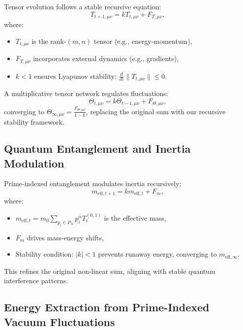 \documentclass{article}
\theoremstyle{plain}
\begin{document}
Tensor evolution follows a stable recursive equation:
\begin{equation}
    T_{t+1,\mu\nu} = k T_{t,\mu\nu} + F_{T,\mu\nu},
\end{equation}
where:
\begin{itemize}
    \item \( T_{t,\mu\nu} \) is the rank-$(m,n)$ tensor (e.g., energy-momentum),
    \item \( F_{T,\mu\nu} \) incorporates external dynamics (e.g., gradients),
    \item \( k < 1 \) ensures Lyapunov stability: \( \frac{d}{dt} \| T_{t,\mu\nu} \| \leq 0 \).
\end{itemize}
A multiplicative tensor network regulates fluctuations:
\begin{equation}
    \Theta_{t,\mu\nu} = k \Theta_{t-1,\mu\nu} + F_{\Theta,\mu\nu},
\end{equation}
converging to \( \Theta_{\infty,\mu\nu} = \frac{F_{\Theta,\mu\nu}}{1 - k} \), replacing the original sum with our recursive stability framework.

\subsection{Quantum Entanglement and Inertia Modulation}
\label{subsec:entanglement_inertia}

Prime-indexed entanglement modulates inertia recursively:
\begin{equation}
    m_{\text{eff},t+1} = k m_{\text{eff},t} + F_{m},
\end{equation}
where:
\begin{itemize}
    \item \( m_{\text{eff},t} = m_0 \sum_{p_i \in P_N} p_i^\alpha T_{t}^{(0,1)} \) is the effective mass,
    \item \( F_m \) drives mass-energy shifts,
    \item Stability condition: \( |k| < 1 \) prevents runaway energy, converging to \( m_{\text{eff},\infty} \).
\end{itemize}
This refines the original non-linear sum, aligning with stable quantum interference patterns.

\subsection{Energy Extraction from Prime-Indexed Vacuum Fluctuations}
\label{subsec:vacuum_extraction}
\end{document}
